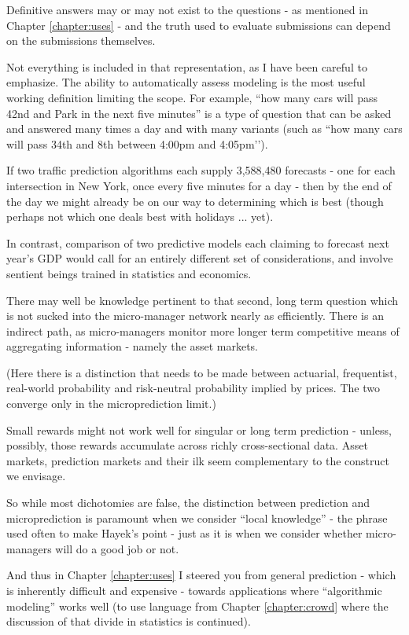 Definitive answers may or may not exist to the questions - as mentioned in Chapter \ref{chapter:uses} - and the truth used to evaluate submissions can depend on the submissions themselves.    


Not everything is included in that representation, as I have been careful to emphasize. The ability to automatically assess modeling is the most useful working definition limiting the scope. For example, ``how many cars will pass 42nd and Park in the next five minutes'' is a type of question that can be asked and answered many times a day and with many variants (such as ``how many cars will pass 34th and 8th between 4:00pm and 4:05pm’’). 


If two traffic prediction algorithms each supply 3,588,480 forecasts - one for each intersection in New York, once every five minutes for a day - then by the end of the day we might already be on our way to determining which is best (though perhaps not which one deals best with holidays ... yet).  

In contrast, comparison of two predictive models each claiming to forecast next year's GDP would call for an entirely different set of considerations, and involve sentient beings trained in statistics and economics. 

There may well be knowledge pertinent to that second, long term question which is not sucked into the micro-manager network nearly as efficiently. There is an indirect path, as micro-managers monitor more longer term competitive means of aggregating information - namely the asset markets. 

(Here there is a distinction that needs to be made between actuarial, frequentist, real-world probability and risk-neutral probability implied by prices. The two converge only in the microprediction limit.)

Small rewards might not work well for singular or long term prediction - unless, possibly, those rewards accumulate across richly cross-sectional data. Asset markets, prediction markets and their ilk seem complementary to the construct we envisage.

So while most dichotomies are false, the distinction between prediction and microprediction is paramount when we consider ``local knowledge'' - the phrase used often to make Hayek's point - just as it is when we consider whether micro-managers will do a good job or not. 

And thus in Chapter \ref{chapter:uses} I steered you from general prediction - which is inherently difficult and expensive - towards applications where ``algorithmic modeling'' works well (to use language from Chapter \ref{chapter:crowd} where the discussion of that divide in statistics is continued). 


